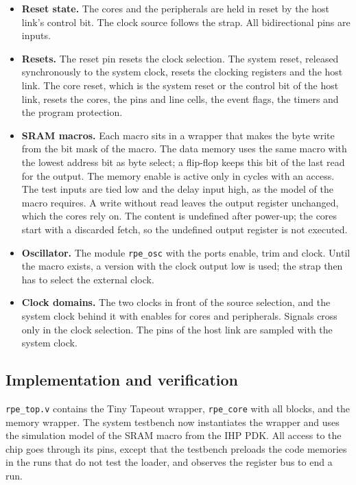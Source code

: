 \documentclass[10pt,a4paper]{article}
\begin{document}
\begin{itemize}
\item \textbf{Reset state.} The cores and the peripherals are held in reset by the host link's control bit. The clock
source follows the strap. All bidirectional pins are inputs.
\item \textbf{Resets.} The reset pin resets the clock selection. The system reset, released synchronously to the
system clock, resets the clocking registers and the host link. The core reset, which is the system reset or the
control bit of the host link, resets the cores, the pins and line cells, the event flags, the timers and the
program protection.
\item \textbf{SRAM macros.} Each macro sits in a wrapper that makes the byte write from the bit mask of the macro.
The data memory uses the same macro with the lowest address bit as byte select; a flip-flop keeps this bit of
the last read for the output. The memory enable is active only in cycles with an access. The test inputs are
tied low and the delay input high, as the model of the macro requires. A write without read leaves the output
register unchanged, which the cores rely on. The content is undefined after power-up; the cores start with a
discarded fetch, so the undefined output register is not executed.
\item \textbf{Oscillator.} The module \texttt{rpe\_osc} with the ports enable, trim and clock. Until the macro
exists, a version with the clock output low is used; the strap then has to select the external clock.
\item \textbf{Clock domains.} The two clocks in front of the source selection, and the system clock behind it with
enables for cores and peripherals. Signals cross only in the clock selection. The pins of the host link are
sampled with the system clock.
\end{itemize}

\subsection{Implementation and verification}\label{sec:topver}

\texttt{rpe\_top.v} contains the Tiny Tapeout wrapper, \texttt{rpe\_core} with all blocks, and the memory wrapper.
The system testbench now instantiates the wrapper and uses the simulation model of the SRAM macro from the IHP
PDK. All access to the chip goes through its pins, except that the testbench preloads the code memories in the
runs that do not test the loader, and observes the register bus to end a run.
\end{document}
